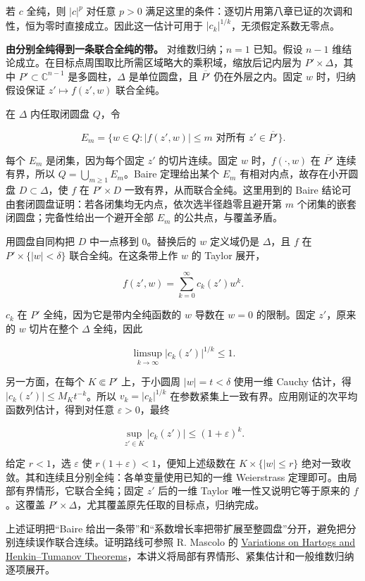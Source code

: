 \documentclass[11pt,a4paper]{article}
\begin{document}
若 \(c\) 全纯，则 \(|c|^p\) 对任意 \(p>0\)
满足这里的条件：逐切片用第八章已证的次调和性，恒为零时直接成立。因此这一估计可用于
\(|c_k|^{1/k}\)，无须假定系数无零点。

\textbf{由分别全纯得到一条联合全纯的带。} 对维数归纳；\(n=1\) 已知。假设
\(n-1\) 维结论成立。在目标点周围取比所需区域略大的乘积域，缩放后记内层为
\(P'\times\Delta\)，其中 \(P'\subset\mathbb C^{n-1}\)
是多圆柱，\(\Delta\) 是单位圆盘，且 \(\overline{P'}\) 仍在外层之内。固定
\(w\) 时，归纳假设保证 \(z'\mapsto f(z',w)\) 联合全纯。

在 \(\Delta\) 内任取闭圆盘 \(Q\)，令

\[
E_m=\{w\in Q:|f(z',w)|\le m\text{ 对所有 }z'\in\overline{P'}\}.
\]

每个 \(E_m\) 是闭集，因为每个固定 \(z'\) 的切片连续。固定 \(w\)
时，\(f(\cdot,w)\) 在 \(\overline{P'}\) 连续有界，所以
\(Q=\bigcup_{m\ge1}E_m\)。Baire 定理给出某个 \(E_m\)
有相对内点，故存在小开圆盘 \(D\subset\Delta\)，使 \(f\) 在
\(P'\times D\) 一致有界，从而联合全纯。这里用到的 Baire
结论可由套闭圆盘证明：若各闭集均无内点，依次选半径趋零且避开第 \(m\)
个闭集的嵌套闭圆盘；完备性给出一个避开全部 \(E_m\)
的公共点，与覆盖矛盾。

用圆盘自同构把 \(D\) 中一点移到 \(0\)。替换后的 \(w\) 定义域仍是
\(\Delta\)，且 \(f\) 在 \(P'\times\{|w|<\delta\}\)
联合全纯。在这条带上作 \(w\) 的 Taylor 展开，

\[
f(z',w)=\sum_{k=0}^\infty c_k(z')w^k.
\]

\(c_k\) 在 \(P'\) 全纯，因为它是带内全纯函数的 \(w\) 导数在 \(w=0\)
的限制。固定 \(z'\)，原来的 \(w\) 切片在整个 \(\Delta\) 全纯，因此

\[
\limsup_{k\to\infty}|c_k(z')|^{1/k}\le1.
\]

另一方面，在每个 \(K\Subset P'\) 上，于小圆周 \(|w|=t<\delta\) 使用一维
Cauchy 估计，得 \(|c_k(z')|\le M_Kt^{-k}\)。所以 \(v_k=|c_k|^{1/k}\)
在参数紧集上一致有界。应用刚证的次平均函数列估计，得到对任意
\(\varepsilon>0\)，最终

\[
\sup_{z'\in K}|c_k(z')|\le(1+\varepsilon)^k.
\]

给定 \(r<1\)，选 \(\varepsilon\) 使
\(r(1+\varepsilon)<1\)，便知上述级数在 \(K\times\{|w|\le r\}\)
绝对一致收敛。其和连续且分别全纯：各单变量使用已知的一维 Weierstrass
定理即可。由局部有界情形，它联合全纯；固定 \(z'\) 后的一维 Taylor
唯一性又说明它等于原来的 \(f\)。这覆盖
\(P'\times\Delta\)，尤其覆盖原先任取的目标点，归纳完成。

上述证明把``Baire
给出一条带''和``系数增长率把带扩展至整圆盘''分开，避免把分别连续误作联合连续。证明路线可参照
R. Mascolo 的
\href{https://rendiconti.dmi.units.it/volumi/39/24.pdf}{Variations on
Hartogs and Henkin--Tumanov
Theorems}，本讲义将局部有界情形、紧集估计和一般维数归纳逐项展开。
\end{document}
